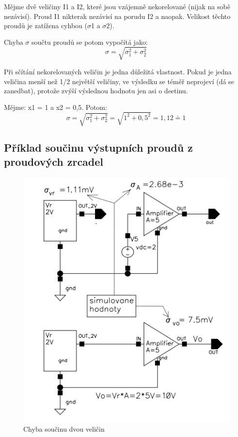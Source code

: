 Mějme dvě veličiny I1 a I2, které jsou vzájemně nekorelované (nijak na sobě nezávisí). Proud I1 nikterak nezávisí na porudu I2 a naopak. Velikost těchto proudů je zatížena cyhbou ($\sigma$1 a $\sigma$2).

Chyba $\sigma$ součtu proudů se potom vypočítá jako:
\begin{equation}
\sigma = \sqrt{\sigma_{1}^{2}+\sigma_{2}^{2}}
\end{equation}

Při sčítání nekorelovaných veličin je jedna důležitá vlastnost. Pokud je jedna veličina menší než 1/2 největší veličiny, ve výsledku se téměř neprojeví (dá se zanedbat), protože zvýší výslednou hodnotu jen asi o deetinu.

Mějme: x1 = 1 a x2 = 0,5. Potom:
\begin{equation}
\sigma = \sqrt{\sigma_{1}^{2}+\sigma_{2}^{2}}=\sqrt{1^{2}+0,5^{2}}=1,12\doteq 1
\end{equation}

\subsection{Příklad součinu výstupních proudů z proudových zrcadel}

\begin{figure}[h]
   \begin{center}
     \includegraphics[scale=0.5]{images/Chyba_Soucinu.png}
   \end{center}
   \caption{Chyba součinu dvou veličin}
\end{figure}

